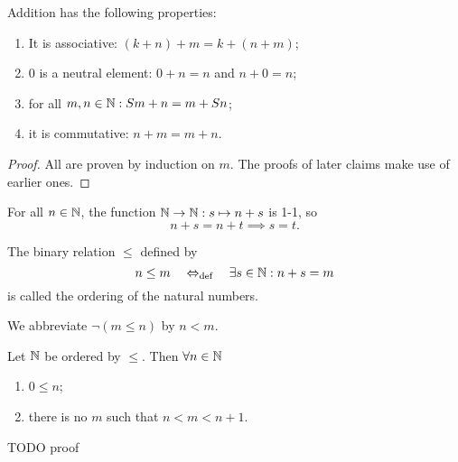 \begin{proposition}
Addition has the following properties:
\begin{enumerate}
\item It is associative: $(k+n)+m = k+(n+m)$;
\item $0$ is a neutral element: $0+n = n$ and $n+0 = n$;
\item for all $m,n\in \mathbb{N}: Sm+n = m+Sn$;
\item it is commutative: $n+m = m+n$.
\end{enumerate}
\end{proposition}
\begin{proof}
All are proven by induction on $m$. The proofs of later claims make use of earlier ones.
\end{proof}
\begin{lemma}
For all $n\in \mathbb{N}$, the function $\mathbb{N}\to \mathbb{N}: s\mapsto n+s$ is 1-1, so
\[n+s = n+t \implies s=t.\]
\end{lemma}

\begin{definition}
The binary relation $\leq$ defined by
\[ n \leq m \quad\Leftrightarrow_{\text{def}}\quad \exists s\in \mathbb{N}: n+s = m \]
is called the ordering of the natural numbers.

We abbreviate $\neg(m\leq n)$ by $n < m$.
\end{definition}

\begin{lemma} \label{lemma:orderingN}
Let $\mathbb{N}$ be ordered by $\leq$. Then $\forall n\in\mathbb{N}$
\begin{enumerate}
\item $0\leq n$;
\item there is no $m$ such that $n<m<n+1$.
\end{enumerate}
\end{lemma}
TODO proof

